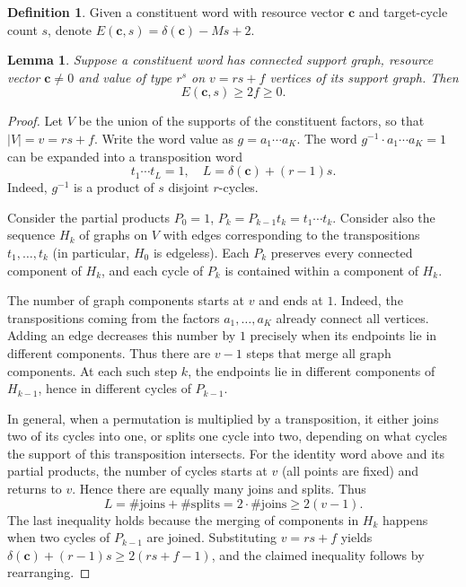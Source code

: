 \documentclass[DIV=12,10pt]{scrartcl}
\newtheorem{lemma}{Lemma}
\theoremstyle{definition}
\newtheorem{definition}{Definition}
\newcommand{\cvec}{\mathbf{c}}
\begin{document}
\begin{definition}
	\label{def:ecs}
Given a constituent word with resource vector $\cvec$ and target-cycle count $s$, denote $E(\cvec,s) = \delta(\cvec)-Ms+2$.
\end{definition}
\begin{lemma}
	\label{lemma:connected-word-defect}
	Suppose a constituent word has connected support graph, resource vector $\cvec\neq 0$ and value of type $r^s$ on $v=rs+f$ vertices of its support graph. Then
	\[
		E(\cvec,s) \geqslant 2f \geqslant 0.
	\]
\end{lemma}
\begin{proof}
Let $V$ be the union of the supports of the constituent factors, so that $|V|=v=rs+f$. Write the word value as $g=a_1\cdots a_K$. The word $g^{-1}\cdot a_1\cdots a_K = 1$ can be expanded into a transposition word 
\[
	t_1\cdots t_L = 1, \quad L=\delta(\cvec)+(r-1)s.
\]
Indeed, $g^{-1}$ is a product of $s$ disjoint $r$-cycles.

Consider the partial products $P_0=1$, $P_k = P_{k-1}t_k = t_1\cdots t_k$. Consider also the sequence $H_k$ of graphs on $V$ with edges corresponding to the transpositions $t_1,\ldots,t_k$ (in particular, $H_0$ is edgeless). Each $P_k$ preserves every connected component of $H_k$, and each cycle of $P_k$ is contained within a component of $H_k$.

The number of graph components starts at $v$ and ends at $1$. Indeed, the transpositions coming from the factors $a_1,\ldots,a_K$ already connect all vertices. Adding an edge decreases this number by $1$ precisely when its endpoints lie in different components. Thus there are $v-1$ steps that merge all graph components. At each such step $k$, the endpoints lie in different components of $H_{k-1}$, hence in different cycles of $P_{k-1}$.

In general, when a permutation is multiplied by a transposition, it either joins two of its cycles into one, or splits one cycle into two, depending on what cycles the support of this transposition intersects. For the identity word above and its partial products, the number of cycles starts at $v$ (all points are fixed) and returns to $v$. Hence there are equally many joins and splits. Thus
\[
L = \#\mathrm{joins} + \#\mathrm{splits} = 2\cdot\#\mathrm{joins} \geqslant 2(v-1).
\]
The last inequality holds because the merging of components in $H_k$ happens when two cycles of $P_{k-1}$ are joined.
Substituting $v=rs+f$ yields $\delta(\cvec)+(r-1)s \geqslant 2(rs+f-1)$, and the claimed inequality follows by rearranging.
\end{proof}
\end{document}
